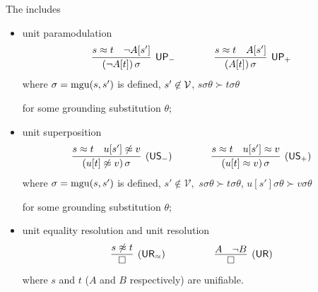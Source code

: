 



\begin{definition}\label{def:unit-superpositin-calculus}
	The  includes
	\begin{itemize}
		\item unit paramodulation
		\begin{gather*}
		\infer
		[\mathsf{UP_-}]
		{(\lnot A[t])\,\sigma}
		{s\mEQ t&\lnot A[s']}
		\qquad\qquad
		\infer
		[\mathsf{UP_+}]
		{(A[t])\,\sigma}
		{s\mEQ t&A[s']}
		\end{gather*}
		where \( \sigma=\operatorname{mgu}(s,s') \) is defined,
		\( s'\not\in\mathcal{V} \),
		\( s\sigma\theta\succ t\sigma\theta \)

		for some grounding substitution \( \theta \);

		\item unit superposition
		\begin{gather*}
		\infer
		[\mathsf{(US_-)}]
		{(u[t]\mNE v)\,\sigma}
		{s\mEQ t&u[s']\mNE v}
		\qquad\qquad
		\infer
		[\mathsf{(US_+)}]
		{(u[t]\mEQ v)\,\sigma}
		{s\mEQ t&u[s']\mEQ v}
		\end{gather*}
		where \( \sigma=\operatorname{mgu}(s,s') \) is defined,
		\( s'\not\in\mathcal{V}, \)
		\( s\sigma\theta\succ t\sigma\theta \),
		\( u[s']\sigma\theta\succ v\sigma\theta \)

		for some grounding substitution \( \theta \);
		\item unit equality resolution and unit resolution
		\begin{gather*}
		\infer
		[\mathsf{(UR_\mEQ)}]
		{\emptyclause}
		{s\mNE t}
		\quad\quad\quad\qquad
		\infer
		[\mathsf{(UR)}]
		{\emptyclause}
		{A&\lnot B}
		\end{gather*}
		where \( s \) and \( t \) (\( A \) and \( B \) respectively) are unifiable.
	\end{itemize}
\end{definition}
